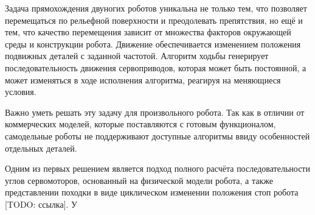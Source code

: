 
Задача прямохождения двуногих роботов уникальна не только тем, что позволяет перемещаться по рельефной поверхности и преодолевать препятствия, но ещё и тем, что качество перемещения зависит от множества факторов окружающей среды и конструкции робота. Движение обеспечивается изменением положения подвижных деталей с заданной частотой. Алгоритм ходьбы генерирует последовательность движения сервоприводов, которая может быть постоянной, а может изменяться в ходе исполнения алгоритма, реагируя на меняющиеся условия.

Важно уметь решать эту задачу для произвольного робота. Так как в отличии от коммерческих моделей, которые поставляются с готовым функционалом, самодельные роботы не поддерживают доступные алгоритмы ввиду особенностей отдельных деталей.

Одним из первых решением является подход полного расчёта последовательности углов сервомоторов, основанный на физической модели робота, а также представлении походки в виде циклическом изменении положения стоп робота [TODO: ссылка]. У 